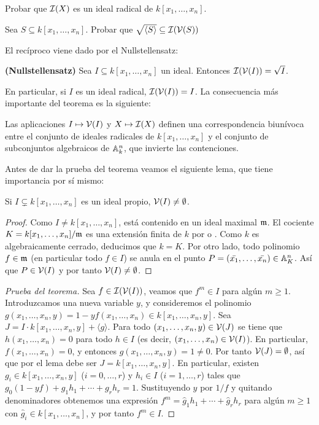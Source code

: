 \documentclass[ACGA.tex]{subfiles}
\begin{document}
\begin{ejer} Probar que $\mathcal{I}(X)$ es un ideal radical de $k[x_1,\ldots,x_n]$.
 \end{ejer}

\begin{ejer}
 Sea $S\subseteq k[x_1,\ldots,x_n]$. Probar que $\sqrt{\langle S\rangle}\subseteq \mathcal{I}(\mathcal{V}(S))$
\end{ejer}

El recíproco viene dado por el Nullstellensatz:

\begin{teorema} {\bf (Nullstellensatz)} Sea $I\subseteq k[x_1,\ldots,x_n]$ un ideal. Entonces $\mathcal{I}(\mathcal{V}(I))=\sqrt{I}$.
\end{teorema}

En particular, si $I$ es un ideal radical, $\mathcal{I}(\mathcal{V}(I))=I$. La consecuencia más importante del teorema es la siguiente:

\begin{coro} Las aplicaciones $I\mapsto \mathcal{V}(I)$ y $X\mapsto \mathcal{I}(X)$ definen una correspondencia biunívoca entre el conjunto de ideales radicales de $k[x_1,\ldots,x_n]$ y el conjunto de subconjuntos algebraicos de $\mathbb{A}^n_k$, que invierte las contenciones. 
 \end{coro}

Antes de dar la prueba del teorema veamos el siguiente lema, que tiene importancia por sí mismo:

\begin{lemma}
 Si $I\subsetneq k[x_1,\ldots,x_n]$ es un ideal propio, $\mathcal{V}(I)\neq\emptyset$.
\end{lemma}

\begin{proof}
 Como $I\neq k[x_1,\ldots,x_n]$, está contenido en un ideal maximal ${\mathfrak{m}}$. El cociente $K=k[x_1,\ldots,x_n]/{\mathfrak{m}}$ es una extensión finita de $k$ por \cite[Teorema 4.10]{reid} o \cite[Corolario 5.24]{am}. Como $k$ es algebraicamente cerrado, deducimos que $k=K$. Por otro lado, todo polinomio $f\in{\mathfrak{m}}$ (en particular todo $f\in I$) se anula en el punto $P=(\bar{x_1},\ldots,\bar{x_n})\in\mathbb{A}^n_K$. Así que $P\in\mathcal{V}(I)$ y por tanto $\mathcal{V}(I)\neq \emptyset$.
\end{proof}

\begin{proof}[Prueba del teorema] Sea $f\in\mathcal{I}(\mathcal{V}(I))$, veamos que $f^m\in I$ para algún $m\geq 1$. Introduzcamos una nueva variable $y$, y consideremos el polinomio $g(x_1,\ldots,x_n,y)=1-yf(x_1,\ldots,x_n)\in k[x_1,\ldots,x_n,y]$. Sea $J=I\cdot k[x_1,\ldots,x_n,y]+\langle g\rangle$. Para todo $(x_1,\ldots,x_n,y)\in\mathcal{V}(J)$ se tiene que $h(x_1,\ldots,x_n)=0$ para todo $h\in I$ (es decir, $(x_1,\ldots,x_n)\in \mathcal{V}(I)$). En particular, $f(x_1,\ldots,x_n)=0$, y entonces $g(x_1,\ldots,x_n,y)=1\neq 0$. Por tanto $\mathcal{V}(J)=\emptyset$, así que por el lema debe ser $J=k[x_1,\ldots,x_n,y]$. En particular, existen $g_i\in k[x_1,\ldots,x_n,y]$ ($i=0,\ldots,r$) y $h_i\in I$ ($i=1,\ldots,r$) tales que $g_0(1-yf)+g_1h_1+\cdots +g_rh_r=1$. Sustituyendo $y$ por $1/f$ y quitando denominadores obtenemos una expresión $f^m=\hat g_1h_1+\cdots+\hat g_rh_r$ para algún $m\geq 1$ con $\hat g_i\in k[x_1,\ldots,x_n]$, y por tanto $f^m\in I$. 
\end{proof}
\end{document}
